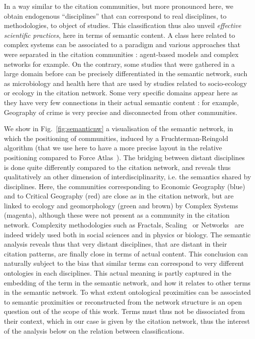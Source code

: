 \documentclass[10pt]{article}
\begin{document}
In a way similar to the citation communities, but more pronounced here, we obtain endogenous ``disciplines'' that can correspond to real disciplines, to methodologies, to object of studies. This classification thus also unveil \emph{effective scientific practices}, here in terms of semantic content. A class here related to complex systems can be associated to a paradigm and various approaches that were separated in the citation communities : agent-based models and complex networks for example. On the contrary, some studies that were gathered in a large domain before can be precisely differentiated in the semantic network, such as microbiology and health here that are used by studies related to socio-ecology or ecology in the citation network. Some very specific domains appear here as they have very few connections in their actual semantic content : for example, Geography of crime is very precise and disconnected from other communities.


We show in Fig.~\ref{fig:semanticnw} a visualisation of the semantic network, in which the positioning of communities, induced by a Fruchterman-Reingold algorithm (that we use here to have a more precise layout in the relative positioning compared to Force Atlas~\citep{jacomy2014forceatlas2}). The bridging between distant disciplines is done quite differently compared to the citation network, and reveals thus qualitatively an other dimension of interdisciplinarity, i.e. the semantics shared by disciplines. Here, the communities corresponding to Economic Geography (blue) and to Critical Geography (red) are close as in the citation network, but are linked to ecology and geomorphology (green and brown) by Complex Systems (magenta), although these were not present as a community in the citation network. Complexity methodologies such as Fractals, Scaling~\citep{west2017scale} or Networks~\citep{newman2003structure} are indeed widely used both in social sciences and in physics or biology. The semantic analysis reveals thus that very distant disciplines, that are distant in their citation patterns, are finally close in terms of actual content. This conclusion can naturally subject to the bias that similar terms can correspond to very different ontologies in each disciplines. This actual meaning is partly captured in the embedding of the term in the semantic network, and how it relates to other terms in the semantic network. To what extent ontological proximities can be associated to semantic proximities or reconstructed from the network structure is an open question out of the scope of this work. Terms must thus not be dissociated from their context, which in our case is given by the citation network, thus the interest of the analysis below on the relation between classifications.
\end{document}
